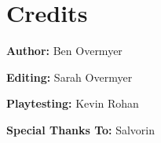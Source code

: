 \chapter{Credits}

\begin{multicols}{2}

\textbf{Author:} Ben Overmyer

\textbf{Editing:} Sarah Overmyer

\textbf{Playtesting:} Kevin Rohan

\textbf{Special Thanks To:} Salvorin

\end{multicols}
